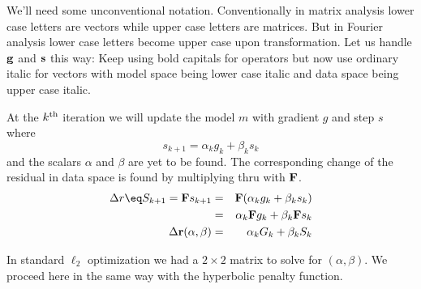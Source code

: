 \par
We'll need some unconventional notation.
Conventionally
in matrix analysis lower case letters are vectors while upper case letters are matrices.
But in Fourier analysis lower case letters become upper case upon transformation.
Let us
handle $\bold g$ and $\bold s$
this way:
Keep using bold capitals for operators
but now use ordinary italic for vectors
with model space being lower case italic and data space being upper case italic.


\par
At the $k^{\rm th}$ iteration we will update the model $m$
with gradient $g$ and step  $s$ where
\begin{equation}
s_{k+1} = \alpha_{k} g_{k} + \beta_{k} s_{k}
\end{equation}
and the scalars $\alpha$ and $\beta$ are yet to be found.
The corresponding change of the residual in data space is found by multiplying thru with $\bold F$.
\begin{eqnarray}
\Delta r \eq
S_{k+1} = \bold F s_{k+1}
&=& \bold F (\alpha_{k} g_{k} + \beta_{k} s_{k})
\\
&=& \alpha_{k} \bold F g_{k} + \beta_{k} \bold F s_{k}
\\
\Delta \bold r(\alpha,\beta)  &=& \alpha_{k} G_{k} + \beta_{k} S_{k}
\end{eqnarray}

\par
In standard $\ell_2$ optimization
we had a $2\times 2$ matrix to solve for $(\alpha,\beta)$.
We proceed here in the same way with the hyperbolic penalty function.


